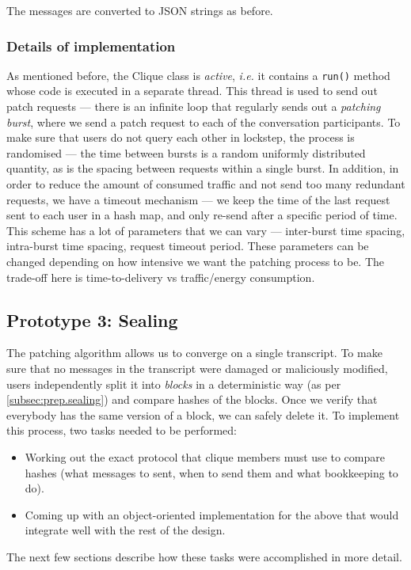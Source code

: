 \documentclass[a4paper, twoside, 12pt]{report}
\begin{document}
The messages are converted to JSON strings as before.


\subsubsection{Details of implementation}
As mentioned before, the Clique class is \emph{active}, \textit{i.e.} it contains a \texttt{run()} method whose code is executed in a separate thread. This thread is used to send out patch requests --- there is an infinite loop that regularly sends out a \emph{patching burst}, where we send a patch request to each of the conversation participants. To make sure that users do not query each other in lockstep, the process is randomised --- the time between bursts is a random uniformly distributed quantity, as is the spacing between requests within a single burst. In addition, in order to reduce the amount of consumed traffic and not send too many redundant requests, we have a timeout mechanism --- we keep the time of the last request sent to each user in a hash map, and only re-send after a specific period of time. \\

This scheme has a lot of parameters that we can vary --- inter-burst time spacing, intra-burst time spacing, request timeout period. These parameters can be changed depending on how intensive we want the patching process to be. The trade-off here is time-to-delivery vs traffic/energy consumption. 


\subsection{Prototype 3: Sealing}
\label{subsec:impl.proto.sealing}
The patching algorithm allows us to converge on a single transcript. To make sure that no messages in the transcript were damaged or maliciously modified, users independently split it into \emph{blocks} in a deterministic way (as per \cref{subsec:prep.sealing}) and compare hashes of the blocks. Once we verify that everybody has the same version of a block, we can safely delete it. To implement this process, two tasks needed to be performed:

\begin{itemize}
    \item Working out the exact protocol that clique members must use to compare hashes (what messages to sent, when to send them and what bookkeeping to do).
    \item Coming up with an object-oriented implementation for the above that would integrate well with the rest of the design.
\end{itemize}
The next few sections describe how these tasks were accomplished in more detail.
\end{document}
